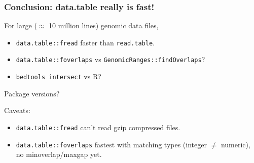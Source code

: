 \documentclass{beamer}
\begin{document}

\begin{frame}
  \frametitle{Conclusion: data.table really is fast!}
  For large ($\approx$ 10 million lines) genomic data files,
  \begin{itemize}
  \item \texttt{data.table::fread} faster than \texttt{read.table}.
  \item \texttt{data.table::foverlaps} vs
    \texttt{GenomicRanges::findOverlaps}?
  \item \texttt{bedtools intersect} vs R?
  \end{itemize}

  Package versions?

  Caveats:
  \begin{itemize}
  \item \texttt{data.table::fread} can't read gzip compressed files.
  \item \texttt{data.table::foverlaps} fastest with matching types
    (integer $\neq$ numeric), no minoverlap/maxgap yet.
  \end{itemize}
\end{frame}







\end{document}
